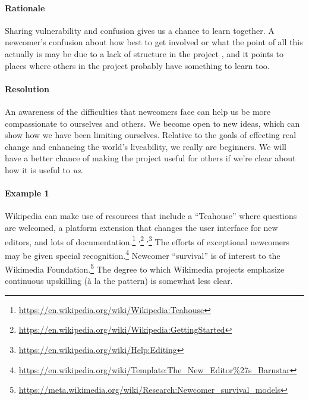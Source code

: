 \begin{refsection}
\paragraph{Rationale} 
%
Sharing vulnerability and confusion gives us a chance to learn
together.  A newcomer's confusion about how best to get involved or
what the point of all this actually is may be due to a lack of
structure in the project , and it points to
places where others in the project probably have something to learn too.
%

\paragraph{Resolution}
An awareness of the difficulties that newcomers face can
help us be more compassionate to ourselves and others.  We
become open to new ideas, which can show how we have
been limiting ourselves.
%
Relative to the goals of effecting real change and enhancing the
world's liveability, we really are beginners.  We will have a better chance of making
the project useful for others if we're clear about how it is useful to \emph{us}.

\paragraph{Example 1} Wikipedia  can make use of resources that
include a ``Teahouse'' where questions are welcomed, a platform extension that changes the user
interface for new editors, and lots of documentation.\footnote{\url{https://en.wikipedia.org/wiki/Wikipedia:Teahouse}}%
\textsuperscript{,}\footnote{\url{https://en.wikipedia.org/wiki/Wikipedia:GettingStarted}}%
\textsuperscript{,}\footnote{\url{https://en.wikipedia.org/wiki/Help:Editing}}
The efforts of exceptional newcomers may be given special
recognition.\footnote{\url{https://en.wikipedia.org/wiki/Template:The_New_Editor\%27s_Barnstar}}
Newcomer ``survival'' is of interest to the Wikimedia
Foundation.\footnote{\url{https://meta.wikimedia.org/wiki/Research:Newcomer_survival_models}}
The degree to which Wikimedia projects emphasize continuous upskilling
(\`a la the  pattern) is somewhat less clear.


\end{refsection}
